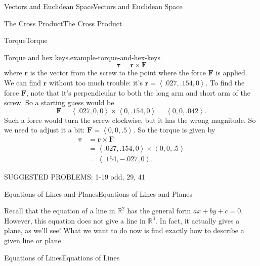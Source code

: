 \documentclass[10pt,]{book}
\numberwithin{equation}{section}
\newcommand{\RR}{\mathbb{R}}
\newcommand{\vv}[1]{\mathbf{#1}}
\newcommand{\dotprod}[1]{\left\langle #1 \right\rangle}
\begin{document}
\begin{chapterptx}{Vectors and Euclidean Space}{}{Vectors and Euclidean Space}{}{}
\begin{sectionptx}{The Cross Product}{}{The Cross Product}{}{}
\begin{subsectionptx}{Torque}{}{Torque}{}{}
\begin{example}{Torque and hex keys.}{example-torque-and-hex-keys}
\begin{equation*}
\boldsymbol{\tau} = \vv{r}\times\vv{F}
\end{equation*}
\hypertarget{p-979}{}%
where \(\vv{r}\) is the vector from the screw to the point where the force \(\vv{F}\) is applied. We can find \(\vv{r}\) without too much trouble: it's \(\vv{r} = \dotprod{.027,.154,0}\). To find the force \(\vv{F}\), note that it's perpendicular to both the long arm and short arm of the screw. So a starting guess would be%
%
\begin{equation*}
\vv{F} = \dotprod{.027,0,0}\times\dotprod{0,.154,0} = \dotprod{0,0,.042}.
\end{equation*}
\hypertarget{p-980}{}%
Such a force would turn the screw clockwise, but it has the wrong magnitude. So we need to adjust it a bit: \(\vv{F} = \dotprod{0,0,.5}\). So the torque is given by%
%
\begin{align*}
\mathbf{\tau} &= \vv{r}\times\vv{F} \\
& = \dotprod{.027,.154,0}\times\dotprod{0,0,.5} \\
& = \dotprod{.154,-.027,0}. 
\end{align*}
\end{example}
\end{subsectionptx}
\begin{conclusion}{}%
\hypertarget{p-981}{}%
SUGGESTED PROBLEMS: 1-19 odd, 29, 41%
\end{conclusion}%
\end{sectionptx}
%
%
\typeout{************************************************}
\typeout{************************************************}
%
\begin{sectionptx}{Equations of Lines and Planes}{}{Equations of Lines and Planes}{}{}\label{section-equations-of-lines-and-planes}
\begin{introduction}{}%
\hypertarget{p-982}{}%
Recall that the equation of a line in \(\RR^{2}\) has the general form \(ax+by + c = 0\). However, this equation does not give a line in \(\RR^{3}\). In fact, it actually gives a plane, as we'll see! What we want to do now is find exactly how to describe a given line or plane.%
\end{introduction}%
%
%
\typeout{************************************************}
\typeout{************************************************}
%
\begin{subsectionptx}{Equations of Lines}{}{Equations of Lines}{}{}\label{subsection-equations-of-lines}

\end{subsectionptx}
\end{sectionptx}
\end{chapterptx}
\end{document}
